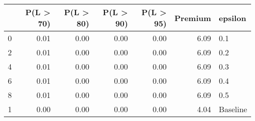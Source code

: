 \begin{tabular}{lrrrrrl}
\toprule
{} &  P(L > 70) &  P(L > 80) &  P(L > 90) &  P(L > 95) &  Premium &   epsilon \\
\midrule
0 &       0.01 &       0.00 &       0.00 &       0.00 &     6.09 &       0.1 \\
2 &       0.01 &       0.00 &       0.00 &       0.00 &     6.09 &       0.2 \\
4 &       0.01 &       0.00 &       0.00 &       0.00 &     6.09 &       0.3 \\
6 &       0.01 &       0.00 &       0.00 &       0.00 &     6.09 &       0.4 \\
8 &       0.01 &       0.00 &       0.00 &       0.00 &     6.09 &       0.5 \\
1 &       0.00 &       0.00 &       0.00 &       0.00 &     4.04 &  Baseline \\
\bottomrule
\end{tabular}

